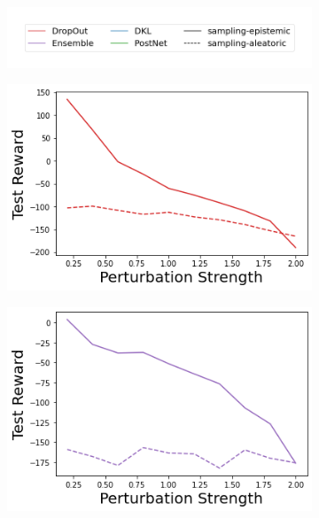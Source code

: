 \begin{figure}
    \centering
        \vspace{-3mm}
    \begin{subfigure}{.45\textwidth}
        \includegraphics[width=\textwidth]{sections/011_icml2022/resources/sampling-legend.png}
    \end{subfigure}
    \vspace{-3mm}

    \begin{subfigure}{.24\textwidth}
        \includegraphics[width=\textwidth]{sections/011_icml2022/resources/action_shift-DropOut-LunarLanderShift-v0-mean_reward_.png}
    \end{subfigure}
    \begin{subfigure}{.24\textwidth}
        \includegraphics[width=\textwidth]{sections/011_icml2022/resources/action_shift-Ensemble-LunarLanderShift-v0-mean_reward_.png}

\end{subfigure}
\end{figure}

